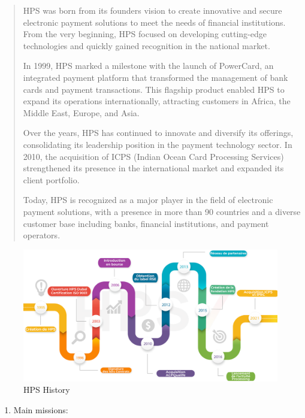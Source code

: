 \documentclass[12pt,a4paper]{report}
\begin{document}
\begin{quote}
HPS was born from its founders\textquotesingle{} vision to create
innovative and secure electronic payment solutions to meet the needs of
financial institutions. From the very beginning, HPS focused on
developing cutting-edge technologies and quickly gained recognition in
the national market.

In 1999, HPS marked a milestone with the launch of PowerCard, an
integrated payment platform that transformed the management of bank
cards and payment transactions. This flagship product enabled HPS to
expand its operations internationally, attracting customers in Africa,
the Middle East, Europe, and Asia.

Over the years, HPS has continued to innovate and diversify its
offerings, consolidating its leadership position in the payment
technology sector. In 2010, the acquisition of ICPS (Indian Ocean Card
Processing Services) strengthened its presence in the international
market and expanded its client portfolio.

Today, HPS is recognized as a major player in the field of electronic
payment solutions, with a presence in more than 90 countries and a
diverse customer base including banks, financial institutions, and
payment operators.
\end{quote}

\begin{figure}[H]
\centering
\includegraphics[width=5.7in]{vertopal_d1b0b2209edd4c6aa8254f57daa0953b/media/image10.png}
\caption{HPS History}
\label{fig:hpsHistory}
\end{figure}



\begin{enumerate}
\def\labelenumi{\arabic{enumi}.}
\setcounter{enumi}{2}
\item
  \protect\hypertarget{_Toc201954397}{}{}Main missions:
\end{enumerate}
\end{document}
